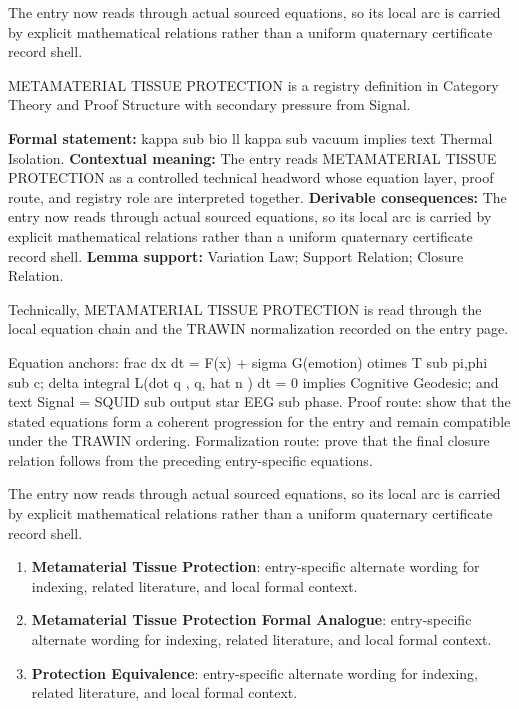 The entry now reads through actual sourced equations, so its local arc is carried by explicit mathematical relations rather than a uniform quaternary certificate record shell.
\clearpage


\begingroup\small
{}
METAMATERIAL TISSUE PROTECTION is a registry definition in Category Theory and Proof Structure with secondary pressure from Signal.

\begingroup\footnotesize\setlength{\emergencystretch}{3em}\sloppy
\textbf{Formal statement:} kappa sub bio ll kappa sub vacuum implies text Thermal Isolation. \textbf{Contextual meaning:} The entry reads METAMATERIAL TISSUE PROTECTION as a controlled technical headword whose equation layer, proof route, and registry role are interpreted together. \textbf{Derivable consequences:} The entry now reads through actual sourced equations, so its local arc is carried by explicit mathematical relations rather than a uniform quaternary certificate record shell. \textbf{Lemma support:} Variation Law; Support Relation; Closure Relation.\par
\endgroup

Technically, METAMATERIAL TISSUE PROTECTION is read through the local equation chain and the TRAWIN normalization recorded on the entry page.

Equation anchors: frac dx dt = F(x) + sigma G(emotion) otimes T sub pi,phi sub c; delta integral L(dot q , q, hat n ) dt = 0 implies Cognitive Geodesic; and text Signal = SQUID sub output star EEG sub phase. Proof route: show that the stated equations form a coherent progression for the entry and remain compatible under the TRAWIN ordering. Formalization route: prove that the final closure relation follows from the preceding entry-specific equations.

The entry now reads through actual sourced equations, so its local arc is carried by explicit mathematical relations rather than a uniform quaternary certificate record shell.
\endgroup

\begin{enumerate}[leftmargin=1.6em,itemsep=6pt,topsep=4pt]
\item \textbf{Metamaterial Tissue Protection}: entry-specific alternate wording for indexing, related literature, and local formal context.
\item \textbf{Metamaterial Tissue Protection Formal Analogue}: entry-specific alternate wording for indexing, related literature, and local formal context.
\item \textbf{Protection Equivalence}: entry-specific alternate wording for indexing, related literature, and local formal context.
\end{enumerate}

